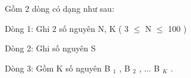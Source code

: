 Gồm 2 dòng có dạng như sau:  

   Dòng 1: Ghi 2 số nguyên N, K ( 3  $\le$  N  $\le$  100 )  

   Dòng 2: Ghi số nguyên S  

   Dòng 3: Gồm K số nguyên B   $_    1   $   , B   $_    2   $   , ... B   $_    K   $   .